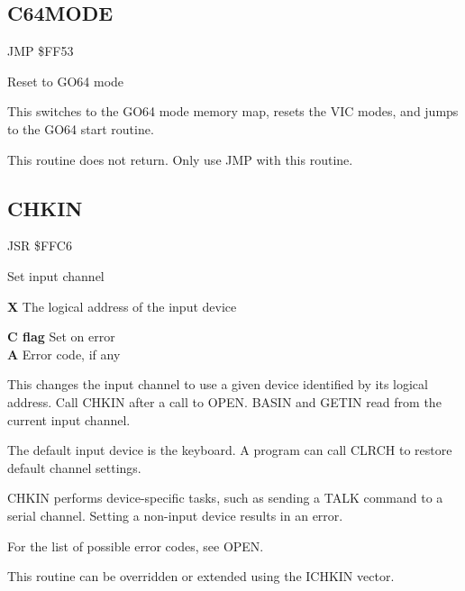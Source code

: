\subsection{C64MODE}
\label{KERNAL Jump Table!C64MODE}
\begin{description}[leftmargin=2cm,style=nextline]
    \item [Address:] JMP \$FF53
    \item [Description:] Reset to GO64 mode
    \item [Remarks:]
        This switches to the GO64 mode memory map, resets the VIC modes, and jumps to the GO64 start routine.

        This routine does not return. Only use JMP with this routine.
    \item [Example:]
\end{description}



\newpage
\subsection{CHKIN}
\label{KERNAL Jump Table!CHKIN}
\begin{description}[leftmargin=2cm,style=nextline]
    \item [Address:] JSR \$FFC6
    \item [Description:] Set input channel
    \item [Inputs:]
        \textbf{X} The logical address of the input device
    \item [Outputs:]
        \textbf{C flag} Set on error \\
        \textbf{A} Error code, if any
    \item [Remarks:]
        This changes the input channel to use a given device identified by its logical address. Call CHKIN after a call to OPEN. BASIN and GETIN read from the current input channel.

        The default input device is the keyboard. A program can call CLRCH to restore default channel settings.

        CHKIN performs device-specific tasks, such as sending a TALK command to a serial channel. Setting a non-input device results in an error.

        For the list of possible error codes, see OPEN.

        This routine can be overridden or extended using the ICHKIN vector.
    \item [Example:]
\end{description}


